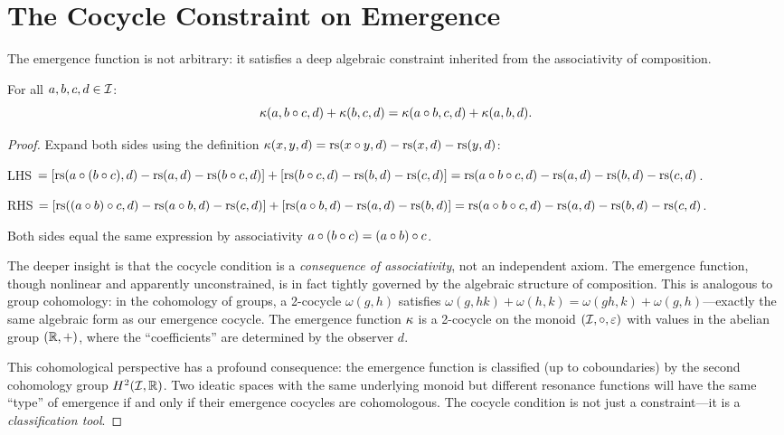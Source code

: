 \section{The Cocycle Constraint on Emergence}

The emergence function is not arbitrary: it satisfies a deep algebraic
constraint inherited from the associativity of composition.

\begin{theorem}
\label{thm:cocycle}
For all $a, b, c, d \in \mathcal{I}$:
\[
\kappa(a, b \circ c, d) + \kappa(b, c, d)
= \kappa(a \circ b, c, d) + \kappa(a, b, d).
\]
\end{theorem}

\begin{proof}
Expand both sides using the definition
$\kappa(x, y, d) = \mathrm{rs}(x \circ y, d) - \mathrm{rs}(x, d) - \mathrm{rs}(y, d)$:

LHS $= [\mathrm{rs}(a \circ (b \circ c), d) - \mathrm{rs}(a, d) - \mathrm{rs}(b \circ c, d)]
+ [\mathrm{rs}(b \circ c, d) - \mathrm{rs}(b, d) - \mathrm{rs}(c, d)]
= \mathrm{rs}(a \circ b \circ c, d) - \mathrm{rs}(a, d) - \mathrm{rs}(b, d) - \mathrm{rs}(c, d)$.

RHS $= [\mathrm{rs}((a \circ b) \circ c, d) - \mathrm{rs}(a \circ b, d) - \mathrm{rs}(c, d)]
+ [\mathrm{rs}(a \circ b, d) - \mathrm{rs}(a, d) - \mathrm{rs}(b, d)]
= \mathrm{rs}(a \circ b \circ c, d) - \mathrm{rs}(a, d) - \mathrm{rs}(b, d) - \mathrm{rs}(c, d)$.

Both sides equal the same expression by associativity
$a \circ (b \circ c) = (a \circ b) \circ c$.

The deeper insight is that the cocycle condition is a \emph{consequence of
associativity}, not an independent axiom. The emergence function, though
nonlinear and apparently unconstrained, is in fact tightly governed by the
algebraic structure of composition. This is analogous to group cohomology:
in the cohomology of groups, a 2-cocycle $\omega(g, h)$ satisfies
$\omega(g, hk) + \omega(h, k) = \omega(gh, k) + \omega(g, h)$---exactly
the same algebraic form as our emergence cocycle. The emergence function
$\kappa$ is a 2-cocycle on the monoid $(\mathcal{I}, \circ, \varepsilon)$ with
values in the abelian group $(\mathbb{R}, +)$, where the ``coefficients'' are
determined by the observer $d$.

This cohomological perspective has a profound consequence: the emergence
function is classified (up to coboundaries) by the second cohomology
group $H^2(\mathcal{I}, \mathbb{R})$. Two ideatic spaces with the same underlying monoid
but different resonance functions will have the same ``type'' of emergence
if and only if their emergence cocycles are cohomologous. The cocycle
condition is not just a constraint---it is a \emph{classification tool}.
\end{proof}

